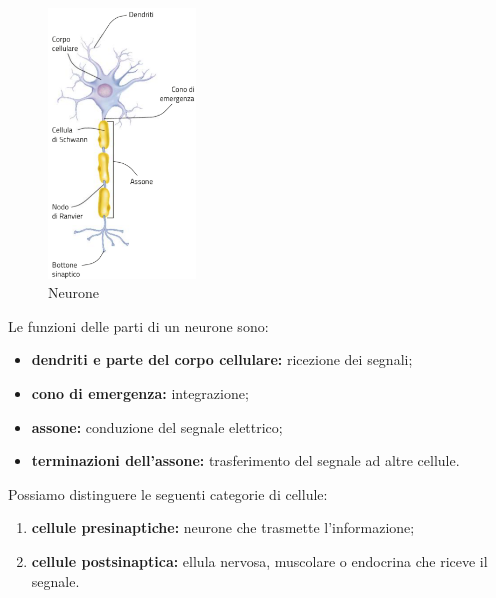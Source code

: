 \documentclass[a4paper]{article}
\begin{document}
\setlength{\intextsep}{0pt}%
\begin{figure}
    \includegraphics[width=0.35\textwidth]{./neuron.png}
    \caption{Neurone}
    \vspace{-1cm}
\end{figure}

Le funzioni delle parti di un neurone sono:
\begin{itemize}
    \item \textbf{dendriti e parte del corpo cellulare:} ricezione dei segnali;
    \item \textbf{cono di emergenza:} integrazione;
    \item \textbf{assone:} conduzione del segnale elettrico;
    \item \textbf{terminazioni dell'assone:} trasferimento del segnale ad altre cellule.
\end{itemize}

Possiamo distinguere le seguenti categorie di cellule:
\begin{enumerate}
    \item \textbf{cellule presinaptiche:} neurone che trasmette l'informazione;
    \item\textbf{cellule postsinaptica:} ellula nervosa, muscolare o endocrina che riceve il segnale.
\end{enumerate}

\wrapfill

\end{document}
